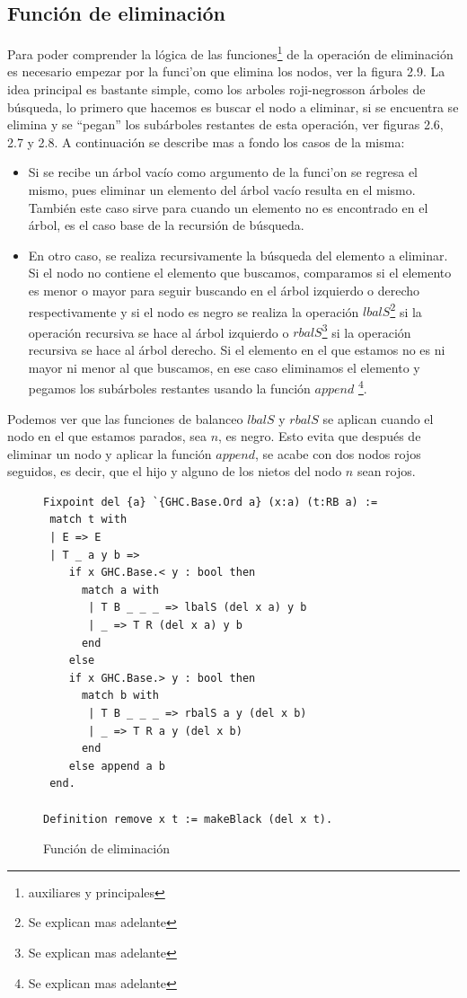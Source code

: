 \documentclass[8pt,leqno,pdflatex,spanish]{book}
\newcommand{\arns}{arboles roji-negros}
\theoremstyle{plain}
\theoremstyle{definition}
\theoremstyle{remark}
\begin{document}
\subsection{Funci\'on de eliminaci\'on}

Para poder comprender la l\'ogica de las funciones\footnote{auxiliares y principales} de la 
operaci\'on de eliminaci\'on es necesario empezar por la funci'on que elimina los nodos, ver la 
figura 2.9. La idea principal es bastante simple, como los \arns son \'arboles de búsqueda, lo 
primero que hacemos es buscar el nodo a eliminar, si se encuentra se elimina y se ``pegan'' los 
subárboles restantes de esta operaci\'on, ver figuras 2.6, 2.7 y 2.8. A continuaci\'on se describe 
mas a fondo los casos de la misma:

\begin{itemize}
    \item Si se recibe un \'arbol vacío como argumento de la funci'on se regresa el mismo, pues 
    eliminar un elemento del \'arbol vacío resulta en el mismo. También este caso sirve para 
    cuando un elemento no es encontrado en el \'arbol, es el caso base de la recursi\'on de 
    búsqueda.
    \item En otro caso, se realiza recursivamente la búsqueda del elemento a eliminar. Si el nodo 
    no contiene el elemento que buscamos, comparamos si el elemento es menor o mayor para seguir 
    buscando en el \'arbol izquierdo o derecho respectivamente y si el nodo es negro se realiza la 
    operaci\'on $lbalS$\footnote{Se explican mas adelante} si la operación recursiva se hace al 
    árbol izquierdo o $rbalS$\footnote{Se explican mas adelante} si la operación recursiva se hace 
    al árbol derecho. Si el elemento en el que estamos no es ni mayor ni menor al que buscamos, en 
    ese caso eliminamos el elemento y pegamos los subárboles restantes usando la función $append$
    \footnote{Se explican mas adelante}.
\end{itemize}

Podemos ver que las funciones de balanceo $lbalS$ y $rbalS$ se aplican cuando el nodo en el que 
estamos parados, sea $n$, es negro. Esto evita que después de eliminar un nodo y aplicar la 
funci\'on $append$, se acabe con dos nodos rojos seguidos, es decir, que el hijo y alguno de los 
nietos del nodo $n$ sean rojos.  

\begin{figure}
\centering 
\captionsetup{justification=centering}
\begin{verbatim}
Fixpoint del {a} `{GHC.Base.Ord a} (x:a) (t:RB a) :=
 match t with
 | E => E
 | T _ a y b =>
    if x GHC.Base.< y : bool then 
      match a with
       | T B _ _ _ => lbalS (del x a) y b
       | _ => T R (del x a) y b
      end
    else 
    if x GHC.Base.> y : bool then 
      match b with
       | T B _ _ _ => rbalS a y (del x b)
       | _ => T R a y (del x b)
      end
    else append a b
 end.

Definition remove x t := makeBlack (del x t).
\end{verbatim}
\caption{Función de eliminación}
\end{figure}
\end{document}

